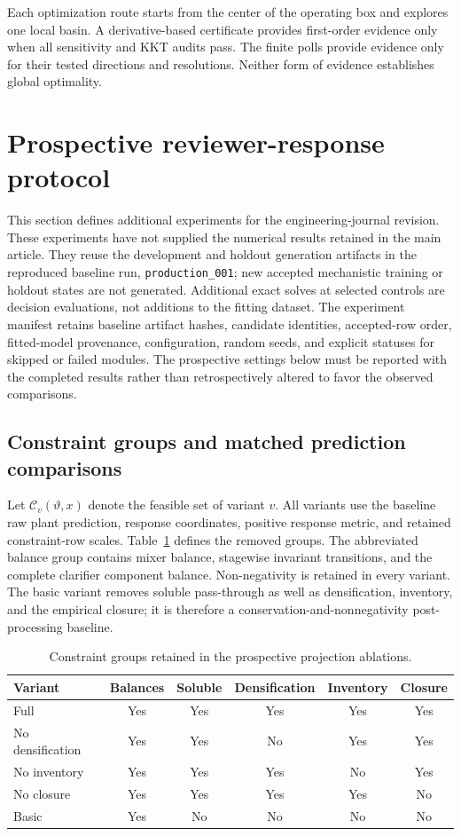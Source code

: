 \documentclass[a4paper,fleqn]{cas-sc}
\begin{document}
Each optimization route starts from the center of the operating box and explores one local basin. A derivative-based certificate provides first-order evidence only when all sensitivity and KKT audits pass. The finite polls provide evidence only for their tested directions and resolutions. Neither form of evidence establishes global optimality.


\section{Prospective reviewer-response protocol}
\label{sec:Sreview}

This section defines additional experiments for the engineering-journal revision. These experiments have not supplied the numerical results retained in the main article. They reuse the development and holdout generation artifacts in the reproduced baseline run, \texttt{production\_001}; new accepted mechanistic training or holdout states are not generated. Additional exact solves at selected controls are decision evaluations, not additions to the fitting dataset. The experiment manifest retains baseline artifact hashes, candidate identities, accepted-row order, fitted-model provenance, configuration, random seeds, and explicit statuses for skipped or failed modules. The prospective settings below must be reported with the completed results rather than retrospectively altered to favor the observed comparisons.

\subsection{Constraint groups and matched prediction comparisons}

Let $\mathcal C_v(\vartheta,x)$ denote the feasible set of variant $v$. All variants use the baseline raw plant prediction, response coordinates, positive response metric, and retained constraint-row scales. Table~\ref{tab:Sablation} defines the removed groups. The abbreviated balance group contains mixer balance, stagewise invariant transitions, and the complete clarifier component balance. Non-negativity is retained in every variant. The basic variant removes soluble pass-through as well as densification, inventory, and the empirical closure; it is therefore a conservation-and-nonnegativity post-processing baseline.

\begin{table}[htbp]
\centering
\caption{Constraint groups retained in the prospective projection ablations.}
\label{tab:Sablation}
\small
\begin{tabular}{lccccc}
\toprule
Variant & Balances & Soluble & Densification & Inventory & Closure\\
\midrule
Full & Yes & Yes & Yes & Yes & Yes\\
No densification & Yes & Yes & No & Yes & Yes\\
No inventory & Yes & Yes & Yes & No & Yes\\
No closure & Yes & Yes & Yes & Yes & No\\
Basic & Yes & No & No & No & No\\
\bottomrule
\end{tabular}
\end{table}
\end{document}
